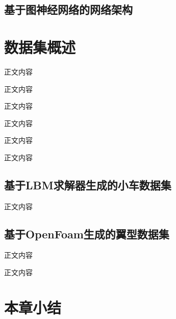 \subsection{基于图神经网络的网络架构}

\section{数据集概述}
正文内容

正文内容

正文内容

正文内容

正文内容

正文内容

\subsection{基于LBM求解器生成的小车数据集}
正文内容

\subsection{基于OpenFoam生成的翼型数据集}
正文内容

正文内容

\section{本章小结}
